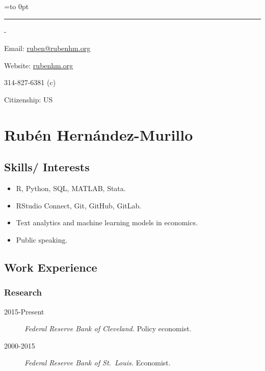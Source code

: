 \documentclass[10pt,]{article}
\newenvironment{nospace}
  {\par\edef\theprevdepth{\the\prevdepth}\nointerlineskip
   \setbox\zerobox=\vtop to 0pt\bgroup
   \hrule height0pt\kern\dimexpr\baselineskip-\topskip\relax
  }
  {\par\vss\egroup\ht\zerobox=0pt \wd\zerobox=0pt \dp\zerobox=0pt
   \box\zerobox}
\def\tightlist{}
\begin{document}
\begin{nospace}\begin{flushright}
Email: \href{mailto:ruben@rubenhm.org}{ruben@rubenhm.org}

Website: \href{http://www.rubenhm.org}{rubenhm.org}

314-827-6381 (c)

Citizenship: US


\end{flushright}\end{nospace}

\hypertarget{rubuxe9n-hernuxe1ndez-murillo}{%
\section{Rubén Hernández-Murillo}\label{rubuxe9n-hernuxe1ndez-murillo}}

\hypertarget{skills-interests}{%
\subsection{Skills/ Interests}\label{skills-interests}}

\begin{itemize}
\tightlist
\item
  R, Python, SQL, MATLAB, Stata.
\item
  RStudio Connect, Git, GitHub, GitLab.
\item
  Text analytics and machine learning models in economics.
\item
  Public speaking.
\end{itemize}

\hypertarget{work-experience}{%
\subsection{Work Experience}\label{work-experience}}

\hypertarget{research}{%
\subsubsection{Research}\label{research}}

\begin{description}
\tightlist
\item[2015-Present]
\emph{Federal Reserve Bank of Cleveland.} Policy economist.
\item[2000-2015]
\emph{Federal Reserve Bank of St.~Louis.} Economist.
\end{description}
\end{document}
